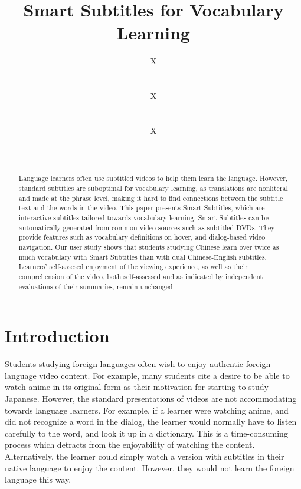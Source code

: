 \documentclass{sigchi}
\begin{document}
\title{Smart Subtitles for Vocabulary Learning}

\author{
  \alignauthor X\\
    \\
    \\
  \alignauthor X \\
    \\
    \\
  \alignauthor X\\
    \\
    \\
}

\maketitle

\begin{abstract}
Language learners often use subtitled videos to help
them learn the language. However, standard subtitles
are suboptimal for vocabulary learning, as
translations are nonliteral and made at the phrase
level, making it hard to find connections between the
subtitle text and the words in the video. This paper
presents Smart Subtitles, which are interactive subtitles
tailored towards vocabulary learning.
Smart Subtitles can be automatically generated from common video sources
such as subtitled DVDs.
They provide features such as vocabulary definitions on hover, and
dialog-based video navigation. Our user study shows
that students studying Chinese learn over twice as much
vocabulary with Smart Subtitles than with dual
Chinese-English subtitles. Learners' self-assesed enjoyment
of the viewing experience, as well as their comprehension
of the video, both self-assessed and
as indicated by independent evaluations of their summaries,
remain unchanged.
\end{abstract}



\section{Introduction}

Students studying foreign languages often wish to enjoy authentic foreign-language video content. For example, many students cite a desire to be able to watch anime in its original form as their motivation for starting to study Japanese. However, the standard presentations of videos are not accommodating towards language learners. For example, if a learner were watching anime, and did not recognize a word in the dialog, the learner would normally have
to listen carefully to the word, and look it up in a dictionary. This is a time-consuming process which detracts from the enjoyability of watching the content. Alternatively, the learner could simply watch a version with subtitles in their native language to enjoy the content. However, they would not learn the foreign language this way.
\end{document}
